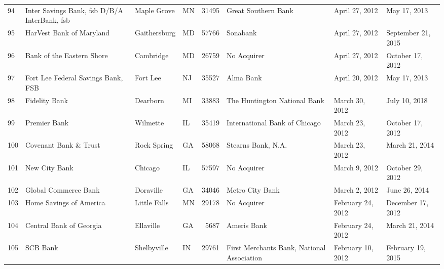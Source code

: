 \begin{tabular}{llllrlll}
94  &       Inter Savings Bank, fsb D/B/A InterBank, fsb &         Maple Grove &  MN &  31495 &                                Great Southern Bank &      April 27, 2012 &        May 17, 2013 \\
95  &                           HarVest Bank of Maryland &        Gaithersburg &  MD &  57766 &                                           Sonabank &      April 27, 2012 &  September 21, 2015 \\
96  &                          Bank of the Eastern Shore &           Cambridge &  MD &  26759 &                                        No Acquirer &      April 27, 2012 &    October 17, 2012 \\
97  &                 Fort Lee Federal Savings Bank, FSB &            Fort Lee &  NJ &  35527 &                                          Alma Bank &      April 20, 2012 &        May 17, 2013 \\
98  &                                      Fidelity Bank &            Dearborn &  MI &  33883 &                       The Huntington National Bank &      March 30, 2012 &       July 10, 2018 \\
99  &                                       Premier Bank &            Wilmette &  IL &  35419 &                      International Bank of Chicago &      March 23, 2012 &    October 17, 2012 \\
100 &                              Covenant Bank \& Trust &         Rock Spring &  GA &  58068 &                                 Stearns Bank, N.A. &      March 23, 2012 &      March 21, 2014 \\
101 &                                      New City Bank &             Chicago &  IL &  57597 &                                        No Acquirer &       March 9, 2012 &    October 29, 2012 \\
102 &                               Global Commerce Bank &           Doraville &  GA &  34046 &                                    Metro City Bank &       March 2, 2012 &       June 26, 2014 \\
103 &                            Home Savings of America &        Little Falls &  MN &  29178 &                                        No Acquirer &   February 24, 2012 &   December 17, 2012 \\
104 &                            Central Bank of Georgia &           Ellaville &  GA &   5687 &                                        Ameris Bank &   February 24, 2012 &      March 21, 2014 \\
105 &                                           SCB Bank &         Shelbyville &  IN &  29761 &         First Merchants Bank, National Association &   February 10, 2012 &   February 19, 2015 \\

\end{tabular}
